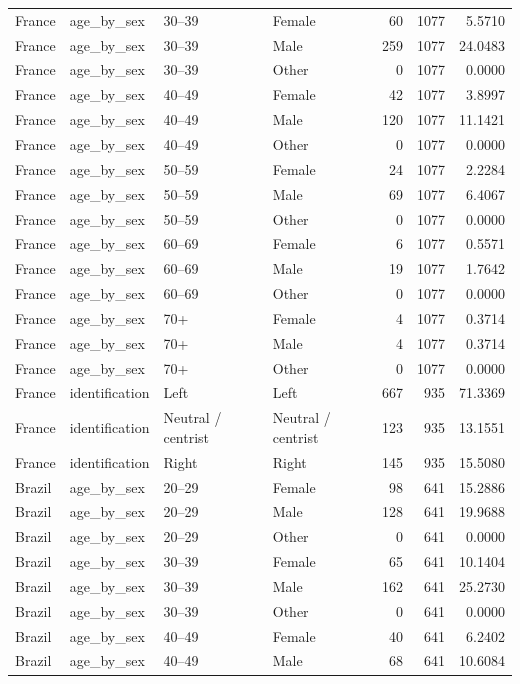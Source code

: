 \begin{tabular}{llllrrr}
France & age_by_sex & 30–39 & Female & 60 & 1077 & 5.5710 \\
France & age_by_sex & 30–39 & Male & 259 & 1077 & 24.0483 \\
France & age_by_sex & 30–39 & Other & 0 & 1077 & 0.0000 \\
France & age_by_sex & 40–49 & Female & 42 & 1077 & 3.8997 \\
France & age_by_sex & 40–49 & Male & 120 & 1077 & 11.1421 \\
France & age_by_sex & 40–49 & Other & 0 & 1077 & 0.0000 \\
France & age_by_sex & 50–59 & Female & 24 & 1077 & 2.2284 \\
France & age_by_sex & 50–59 & Male & 69 & 1077 & 6.4067 \\
France & age_by_sex & 50–59 & Other & 0 & 1077 & 0.0000 \\
France & age_by_sex & 60–69 & Female & 6 & 1077 & 0.5571 \\
France & age_by_sex & 60–69 & Male & 19 & 1077 & 1.7642 \\
France & age_by_sex & 60–69 & Other & 0 & 1077 & 0.0000 \\
France & age_by_sex & 70+ & Female & 4 & 1077 & 0.3714 \\
France & age_by_sex & 70+ & Male & 4 & 1077 & 0.3714 \\
France & age_by_sex & 70+ & Other & 0 & 1077 & 0.0000 \\
France & identification & Left & Left & 667 & 935 & 71.3369 \\
France & identification & Neutral / centrist & Neutral / centrist & 123 & 935 & 13.1551 \\
France & identification & Right & Right & 145 & 935 & 15.5080 \\
Brazil & age_by_sex & 20–29 & Female & 98 & 641 & 15.2886 \\
Brazil & age_by_sex & 20–29 & Male & 128 & 641 & 19.9688 \\
Brazil & age_by_sex & 20–29 & Other & 0 & 641 & 0.0000 \\
Brazil & age_by_sex & 30–39 & Female & 65 & 641 & 10.1404 \\
Brazil & age_by_sex & 30–39 & Male & 162 & 641 & 25.2730 \\
Brazil & age_by_sex & 30–39 & Other & 0 & 641 & 0.0000 \\
Brazil & age_by_sex & 40–49 & Female & 40 & 641 & 6.2402 \\
Brazil & age_by_sex & 40–49 & Male & 68 & 641 & 10.6084 \\

\end{tabular}
